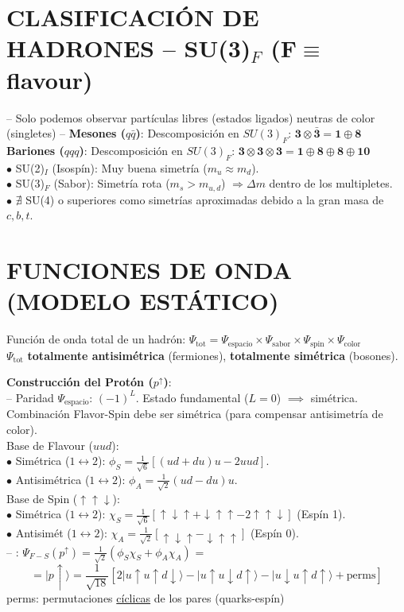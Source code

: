 \section{CLASIFICACIÓN DE HADRONES -- SU(3)$_F$ (F$\equiv$ flavour)}
-- Solo podemos observar partículas libres (estados ligados) neutras de color (singletes) --
\textbf{Mesones ($q\bar{q}$)}:
Descomposición en $SU(3)_F$: $ \mathbf{3} \otimes \mathbf{\bar{3}} = \mathbf{1} \oplus \mathbf{8} $\\
\textbf{Bariones ($qqq$)}:
Descomposición en $SU(3)_F$:
$ \mathbf{3} \otimes \mathbf{3} \otimes \mathbf{3} = \mathbf{1} \oplus \mathbf{8} \oplus \mathbf{8} \oplus \mathbf{10} $\\
$\bullet$ SU(2)$_I$ (Isospín): Muy buena simetría ($m_u \approx m_d$).\\
$\bullet$ SU(3)$_F$ (Sabor): Simetría rota ($m_s > m_{u,d}$) $\Rightarrow \Delta m$ dentro de los multipletes.\\
$\bullet$ $\nexists$ SU(4) o superiores como simetrías aproximadas debido a la gran masa de $c, b, t$.



\section{FUNCIONES DE ONDA (MODELO ESTÁTICO)}
Función de onda total de un hadrón:
$\Psi_{\text{tot}} = \Psi_{\text{espacio}} \times \Psi_{\text{sabor}} \times \Psi_{\text{spin}} \times \Psi_{\text{color}} $\\
$\Psi_{\text{tot}}$ \textbf{totalmente antisimétrica} (fermiones), \textbf{totalmente simétrica} (bosones).

\textbf{Construcción del Protón ($p^\uparrow$)}:\\
-- Paridad $\Psi_{\text{espacio}}$: $(-1)^L$. Estado fundamental ($L=0$) $\implies$ 
simétrica.\\
Combinación Flavor-Spin debe ser simétrica (para compensar antisimetría de color).\\
Base de Flavour ($uud$):\\
$\bullet$ Simétrica ($1\leftrightarrow 2$): $\phi_S = \frac{1}{\sqrt{6}}[(ud+du)u - 2uud]$.\\
$\bullet$ Antisimétrica ($1\leftrightarrow 2$): $\phi_A = \frac{1}{\sqrt{2}}(ud-du)u$.\\
Base de Spin ($\uparrow\uparrow\downarrow$):\\
$\bullet$ Simétrica ($1\leftrightarrow 2$): $\chi_S = \frac{1}{\sqrt{6}} [\uparrow\downarrow\uparrow + \downarrow\uparrow\uparrow -2 \uparrow\uparrow\downarrow]$ (Espín 1).\\
$\bullet$ Antisimét ($1\leftrightarrow 2$): $\chi_A = \frac{1}{\sqrt{2}} [\uparrow\downarrow\uparrow-\downarrow\uparrow\uparrow]$ (Espín 0).\\
-- : $ \Psi_{F-S}(p^\uparrow) = \frac{1}{\sqrt{2}} (\phi_S \chi_S + \phi_A \chi_A) $ = 
$$= | p \uparrow\rangle   = \frac{1}{\sqrt{18}} [2|u\!\uparrow u\!\uparrow d\!\downarrow\rangle - |u\!\uparrow u\!\downarrow \!d\uparrow\rangle - |u\!\downarrow u\!\uparrow d\!\uparrow\rangle + \text{perms} ] $$
perms: permutaciones \underline{cíclicas} de los pares (quarks-espín)

